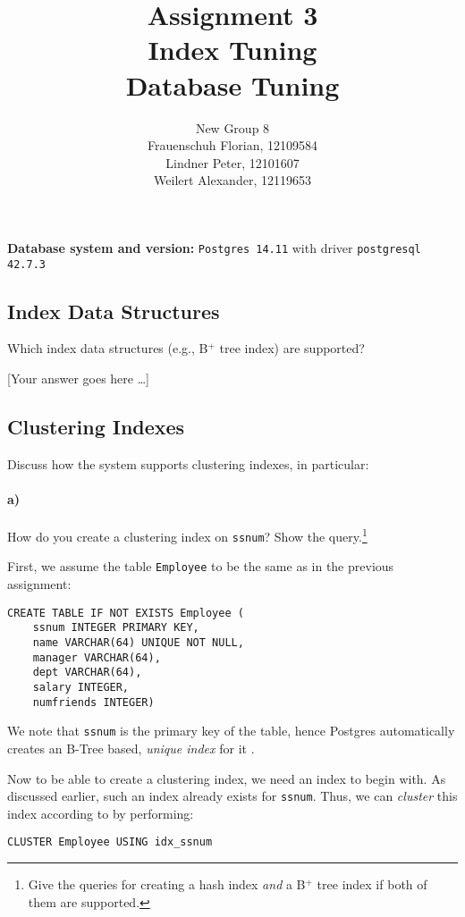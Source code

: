 \documentclass[11pt]{scrartcl}
\title{
  \textbf{\large Assignment 3} \\
  Index Tuning \\
  {\large Database Tuning}}
\author{
  New Group 8 \\
  \large Frauenschuh Florian, 12109584 \\
  \large Lindner Peter, 12101607 \\
  \large Weilert Alexander, 12119653
}
\newcommand{\youranswerhere}{[Your answer goes here \ldots]}
\begin{document}
\maketitle

\textbf{Database system and version:} \texttt{Postgres 14.11} with driver \texttt{postgresql 42.7.3} \\

\subsection{Index Data Structures}

Which index data structures (e.g., B$^+$ tree index) are supported?

\youranswerhere{}

\subsection{Clustering Indexes}

Discuss how the system supports clustering indexes, in particular:

\paragraph{a)}

How do you create a clustering index on \texttt{ssnum}? Show the query.\footnote{Give the queries for creating a hash index \emph{and} a B$^+$ tree index if both of them are supported.}

First, we assume the table \texttt{Employee} to be the same as in the previous assignment:
\begin{lstlisting}[style=dbtsql]
CREATE TABLE IF NOT EXISTS Employee (
    ssnum INTEGER PRIMARY KEY,
    name VARCHAR(64) UNIQUE NOT NULL,
    manager VARCHAR(64),
    dept VARCHAR(64),
    salary INTEGER,
    numfriends INTEGER)
\end{lstlisting}

We note that \texttt{ssnum} is the primary key of the table, hence Postgres automatically creates an B-Tree based,
\textit{unique index} for it \cite{PostgreSQL2023Unique}.

Now to be able to create a clustering index, we need an index to begin with.
As discussed earlier, such an index already exists for \texttt{ssnum}.
Thus, we can \textit{cluster} this index according to \cite{PostgreSQL2023Cluster} by performing:

\begin{lstlisting}[style=dbtsql]
CLUSTER Employee USING idx_ssnum
\end{lstlisting}
\end{document}
